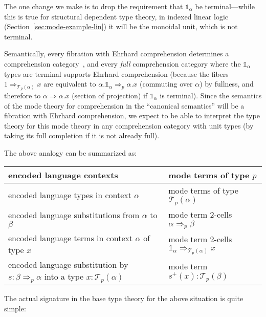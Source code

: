 \documentclass[10pt]{article}
\theoremstyle{definition}
\newcommand{\tcell}{\Rightarrow}
\newcommand\TrPlus[2]{\ensuremath{{#1}^+(#2)}}
\newcommand\El[2]{\mathcal{T}_{#1}(#2)}
\newcommand\One{\ensuremath{\mathds{1}}}
\begin{document}
The one change we make is to drop the requirement that $\One_\alpha$ be
terminal---while this is true for structural dependent type theory, in
indexed linear logic (Section~\ref{sec:mode-example-lin}) it will be the
monoidal unit, which is not terminal.

Semantically, every fibration with Ehrhard comprehension determines a
comprehension category~\citep{jacobs93comprehension}, and every
\emph{full} comprehension category where the $\One_\alpha$ types are
terminal supports Ehrhard comprehension (because the fibers $1
\tcell_{\El p \alpha} x$ are equivalent to $\alpha.\One_\alpha \tcell_p
\alpha.x$ (commuting over $\alpha$) by fullness, and therefore to
$\alpha \tcell \alpha.x$ (section of projection) if $\One_\alpha$ is
terminal).  Since the semantics of the mode theory for comprehension in
the ``canonical semantics'' will be a fibration with Ehrhard
comprehension, we expect to be able to interpret the type theory for
this mode theory in any comprehension category with unit types (by
taking its full completion if it is not already full).  

The above analogy can be summarized as:

\begin{center}
\begin{tabular}{|l|l|}
  \hline
  encoded language contexts & mode terms of type $p$ \\
  \hline
  encoded language types in context $\alpha$ & mode terms of type $\El p \alpha$ \\
  \hline
  encoded language substitutions from $\alpha$ to $\beta$ & mode term 2-cells $\alpha \tcell_p \beta$ \\
  \hline
  encoded language terms in context $\alpha$ of type $x$ & mode term 2-cells $\One_\alpha \tcell_{\El{p}{\alpha}} x$ \\
  \hline
  encoded language substitution by $s : \beta \tcell_p \alpha$ into a type $x : \El p \alpha$  & mode term $\TrPlus{s}{x} : \El{p}{\beta}$ \\
  \hline
\end{tabular}
\end{center}

The actual signature in the base type theory for the above situation is quite simple:
\end{document}
